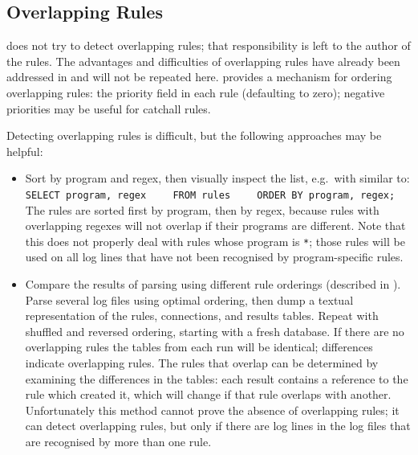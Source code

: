 \subsection{Overlapping Rules}

\label{overlapping rules in implementation}

\parsername{} does not try to detect overlapping rules; that responsibility
is left to the author of the rules.  The advantages and difficulties of
overlapping rules have already been addressed in  and will not be repeated here.  \parsername{}
provides a mechanism for ordering overlapping rules: the priority field in
each rule (defaulting to zero); negative priorities may be useful for
catchall rules.

Detecting overlapping rules is difficult, but the following approaches may
be helpful:

\begin{itemize}

    \item Sort by program and regex, then visually inspect the list, e.g.\
        with  similar to:      \newline{}
        \verb!SELECT program, regex!        \newline{}
        \verb!    FROM rules!               \newline{}
        \verb!    ORDER BY program, regex;! \newline{}
        The rules are sorted first by program, then by regex, because rules
        with overlapping regexes will not overlap if their programs are
        different.  Note that this does not properly deal with rules whose
        program is \texttt{*}; those rules will be used on all log lines
        that have not been recognised by program-specific rules.

    \item Compare the results of parsing using different rule orderings
        (described in \sectionref{rule ordering for efficiency}).  Parse
        several log files using optimal ordering, then dump a textual
        representation of the rules, connections, and results tables.
        Repeat with shuffled and reversed ordering, starting with a fresh
        database.  If there are no overlapping rules the tables from each
        run will be identical; differences indicate overlapping rules.  The
        rules that overlap can be determined by examining the differences
        in the tables: each result contains a reference to the rule which
        created it, which will change if that rule overlaps with another.
        Unfortunately this method cannot prove the absence of overlapping
        rules; it can detect overlapping rules, but only if there are log
        lines in the log files that are recognised by more than one rule.

\end{itemize}

